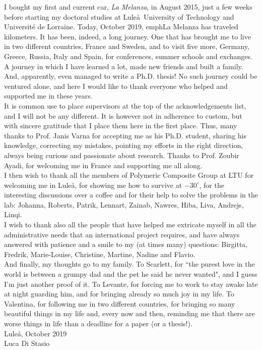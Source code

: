 I bought my first and current car, \emph{La Melanza}, in August 2015, just a few weeks before starting my doctoral studies at Lule\aa\ University of Technology and Universit\'e de Lorraine. Today, October 2019, emph{La Melanza} has traveled kilometers. It has been, indeed, a long journey. One that has brought me to live in two different countries, France and Sweden, and to visit five more, Germany, Greece, Russia, Italy and Spain, for conferences, summer schools and exchanges. A journey in which I have learned a lot, made new friends and built a family. And, apparently, even managed to write a Ph.D. thesis! No such journey could be ventured alone, and here I would like to thank everyone who helped and supported me in these years.\\
It is common use to place supervisors at the top of the acknowledgements list, and I will not be any different. It is however not in adherence to custom, but with sincere gratitude that I place them here in the first place. Thus, many thanks to Prof. Janis Varna for accepting me as his Ph.D. student, sharing his knowledge, correcting my mistakes, pointing my efforts in the right direction, always being curious and passionate about research. Thanks to Prof. Zoubir Ayadi, for welcoming me in France and supporting me all along.\\
I then wish to thank all the members of Polymeric Composite Group at LTU for welcoming me in Lule\aa, for showing me how to survive at $-30^{\circ}$, for the interesting discussions over a coffee and for their help to solve the problems in the lab: Johanna, Roberts, Patrik, Lennart, Zainab, Nawres, Hiba, Liva, Andrejs, Linqi.\\
I wish to thank also all the people that have helped me extricate myself in all the administrative needs that an international project requires, and have always answered with patience and a smile to my (at times many) questions: Birgitta, Fredrik, Marie-Louise, Christine, Martine, Nadine and Flavio.\\
And finally, my thoughts go to my family. To Scarlett, for ``the purest love in the world is between a grumpy dad and the pet he said he never wanted", and I guess I'm just another proof of it. To Levante, for forcing me to work to stay awake late at night guarding him, and for bringing already so much joy in my life. To Valentina, for following me in two different countries, for bringing so many beautiful things in my life and, every now and then, reminding me that there are worse things in life than a deadline for a paper (or a thesis!).\\

\noindent Lule\aa, October 2019\\
Luca Di Stasio

